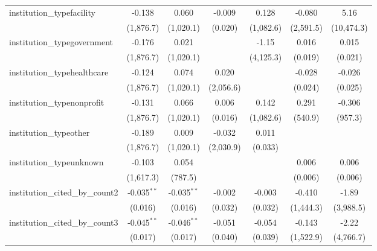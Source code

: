 \begin{tabular}{lcccccc}
   institution\_typefacility             & -0.138        & 0.060         & -0.009         & 0.128          & -0.080    & 5.16\\   
                                         & (1,876.7)     & (1,020.1)     & (0.020)        & (1,082.6)      & (2,591.5) & (10,474.3)\\   
   institution\_typegovernment           & -0.176        & 0.021         &                & -1.15          & 0.016     & 0.015\\   
                                         & (1,876.7)     & (1,020.1)     &                & (4,125.3)      & (0.019)   & (0.021)\\   
   institution\_typehealthcare           & -0.124        & 0.074         & 0.020          &                & -0.028    & -0.026\\   
                                         & (1,876.7)     & (1,020.1)     & (2,056.6)      &                & (0.024)   & (0.025)\\   
   institution\_typenonprofit            & -0.131        & 0.066         & 0.006          & 0.142          & 0.291     & -0.306\\   
                                         & (1,876.7)     & (1,020.1)     & (0.016)        & (1,082.6)      & (540.9)   & (957.3)\\   
   institution\_typeother                & -0.189        & 0.009         & -0.032         & 0.011          &           &   \\   
                                         & (1,876.7)     & (1,020.1)     & (2,030.9)      & (0.033)        &           &   \\   
   institution\_typeunknown              & -0.103        & 0.054         &                &                & 0.006     & 0.006\\   
                                         & (1,617.3)     & (787.5)       &                &                & (0.006)   & (0.006)\\   
   institution\_cited\_by\_count2        & -0.035$^{**}$ & -0.035$^{**}$ & -0.002         & -0.003         & -0.410    & -1.89\\   
                                         & (0.016)       & (0.016)       & (0.032)        & (0.032)        & (1,444.3) & (3,988.5)\\   
   institution\_cited\_by\_count3        & -0.045$^{**}$ & -0.046$^{**}$ & -0.051         & -0.054         & -0.143    & -2.22\\   
                                         & (0.017)       & (0.017)       & (0.040)        & (0.039)        & (1,522.9) & (4,766.7)\\   

\end{tabular}

